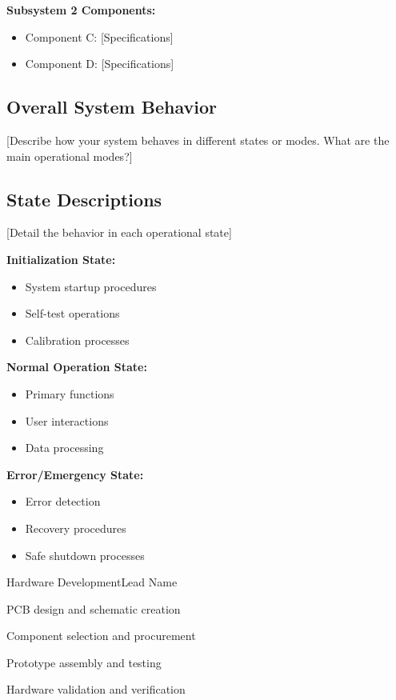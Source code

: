 \documentclass[final]{designreport}
\begin{document}
\textbf{Subsystem 2 Components:}
\begin{itemize}
    \item Component C: [Specifications]
    \item Component D: [Specifications]
\end{itemize}

\behavioralmodels

\subsection{Overall System Behavior}
[Describe how your system behaves in different states or modes. What are the main operational modes?]

\subsection{State Descriptions}
[Detail the behavior in each operational state]

\textbf{Initialization State:}
\begin{itemize}
    \item System startup procedures
    \item Self-test operations
    \item Calibration processes
\end{itemize}

\textbf{Normal Operation State:}
\begin{itemize}
    \item Primary functions
    \item User interactions
    \item Data processing
\end{itemize}

\textbf{Error/Emergency State:}
\begin{itemize}
    \item Error detection
    \item Recovery procedures
    \item Safe shutdown processes
\end{itemize}

\projectplan

\workbreakdown

\begin{subproject}{Hardware Development}{Lead Name}
    \item PCB design and schematic creation
    \item Component selection and procurement
    \item Prototype assembly and testing
    \item Hardware validation and verification
\end{subproject}
\end{document}
